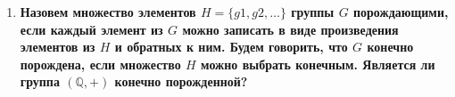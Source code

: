 \documentclass{article}
\begin{document}
\begin{enumerate}
\begin{itemize}
\begin{enumerate}
\begin{itemize}
                            $bab=ab^2b=a$, $b^2a=abaa=ab$.
                        \begin{center}
                        \noindent\begin{tabular}{c | c c c c c}
                            $e$ & $a$ & $b$ & $b^2$ & $ab$ & $ab^2$ \\
                            \cline{1-6}
                            $a$ & $e$ & $ab$ & $ab^2$ & $b$ & $b^2$\\
                            $b$ & $ab^2$ & $b^2$ & $e$ & $a$ & $b^2$\\
                            $b^2$ & $ab$ & $e$ & $b$ & $ab^2$ & $ab$\\
                            $ab$ & $b^2$ & $ab^2$ & $a$ & $e$ & $b$\\
                            $ab^2$ & $b$ & $a$ & $ab$ & $b^2$ & $e$\\
                        \end{tabular}
                        \end{center}
                        У нас три инволюции $a$, $ab$, $ab^2$. И два элемента
                        порядка 3, что очень похоже на $S_3$. Сопоставив
                        \begin{align*}
                            a&\mapsto(12)\quad ab\mapsto(23)\quad ab^2\mapsto(13)\\
                            b=a(ab)&\mapsto(12)(23)=(321)\quad b^2=a(ab^2)\mapsto(12)(13)=(123)\\
                        \end{align*}
                            мы получим изоморфизм. Так как $aba=(23)(12)=(123)=
                            b^2$.
                    \end{itemize}
                \end{enumerate}
        \end{itemize}
    \item \textbf{Назовем множество элементов $H=\{g1,g2,\ldots\}$ группы $G$
        порождающими, если каждый элемент из $G$ можно записать в виде
        произведения элементов из $H$ и обратных к ним. Будем говорить, что $G$
        конечно порождена, если множество $H$ можно выбрать конечным. Является
        ли группа $(\mathbb{Q},+)$ конечно порожденной?}


\end{enumerate}
\end{document}
